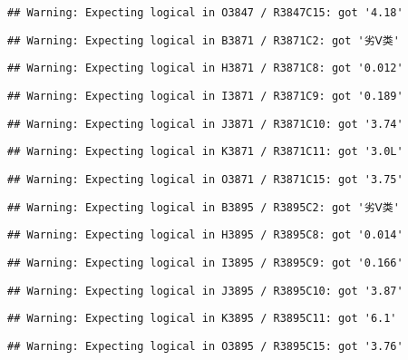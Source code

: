 \documentclass[
]{article}
\begin{document}
\begin{verbatim}
## Warning: Expecting logical in O3847 / R3847C15: got '4.18'
\end{verbatim}

\begin{verbatim}
## Warning: Expecting logical in B3871 / R3871C2: got '劣Ⅴ类'
\end{verbatim}

\begin{verbatim}
## Warning: Expecting logical in H3871 / R3871C8: got '0.012'
\end{verbatim}

\begin{verbatim}
## Warning: Expecting logical in I3871 / R3871C9: got '0.189'
\end{verbatim}

\begin{verbatim}
## Warning: Expecting logical in J3871 / R3871C10: got '3.74'
\end{verbatim}

\begin{verbatim}
## Warning: Expecting logical in K3871 / R3871C11: got '3.0L'
\end{verbatim}

\begin{verbatim}
## Warning: Expecting logical in O3871 / R3871C15: got '3.75'
\end{verbatim}

\begin{verbatim}
## Warning: Expecting logical in B3895 / R3895C2: got '劣Ⅴ类'
\end{verbatim}

\begin{verbatim}
## Warning: Expecting logical in H3895 / R3895C8: got '0.014'
\end{verbatim}

\begin{verbatim}
## Warning: Expecting logical in I3895 / R3895C9: got '0.166'
\end{verbatim}

\begin{verbatim}
## Warning: Expecting logical in J3895 / R3895C10: got '3.87'
\end{verbatim}

\begin{verbatim}
## Warning: Expecting logical in K3895 / R3895C11: got '6.1'
\end{verbatim}

\begin{verbatim}
## Warning: Expecting logical in O3895 / R3895C15: got '3.76'
\end{verbatim}
\end{document}
